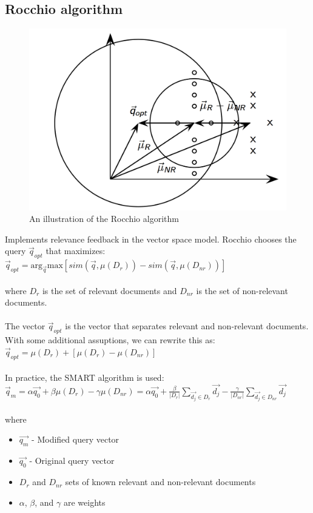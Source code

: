 \documentclass{article}%
\begin{document}
\subsection*{Rocchio algorithm}
\begin{figure}[h]
    \caption{An illustration of the Rocchio algorithm}
    \includegraphics[scale=.3]{Rocchio.png}
    \centering
\end{figure}
Implements relevance feedback in the vector space model. Rocchio chooses the query $\vec{q}_{opt}$
that maximizes: \\

$\vec{q}_{opt} = \textrm{arg}_{\vec{q}} \textrm{max} [sim(\vec{q}, \mu(D_r)) - sim(\vec{q}, \mu(D_{nr}))]$ \\
\\
where $D_r$ is the set of relevant documents and $D_{nr}$ is the set of non-relevant documents.\\
\vspace{2mm}\\
The vector $\vec{q}_{opt}$ is the vector that separates relevant and non-relevant documents. With some additional
assuptions, we can rewrite this as: \\

$\vec{q}_{opt} = \mu(D_r) + [\mu(D_r) - \mu(D_{nr})]$\\
\\
In practice, the SMART algorithm is used: \\

$\vec{q}_m = \alpha \vec{q_0} + \beta \mu(D_r) - \gamma \mu(D_{nr})
= \alpha \vec{q_0} + \frac{\beta}{|D_r|} \sum\limits_{\vec{d_j} \in D_r}\vec{d_j} - \frac{\gamma}{|D_{nr}|} \sum\limits_{\vec{d_j} \in D_{nr}} \vec{d_j}$ \\
\\
where
\begin{itemize}
    \item $\vec{q_m}$ - Modified query vector
    \item $\vec{q_0}$ - Original query vector
    \item $D_r$ and $D_{nr}$ sets of known relevant and non-relevant documents
    \item $\alpha$, $\beta$, and $\gamma$ are weights
\end{itemize}
\end{document}
